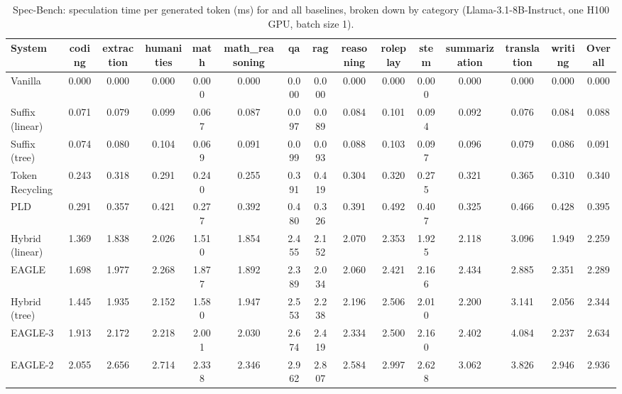 \begin{table}[htbp]
\centering
\caption{Spec-Bench: speculation time per generated token (ms) for \SuffixDecoding and all baselines, broken down by category (Llama-3.1-8B-Instruct, one H100 GPU, batch size 1).}
\label{suffixdecoding:tab:spec-spectime}
\small
\begin{adjustbox}{width=\linewidth}
\begin{tabular}{lcccccccccccccc}
\toprule
\textbf{System} & coding & extraction & humanities & math & math\_reasoning & qa & rag & reasoning & roleplay & stem & summarization & translation & writing & \textbf{Overall} \\
\midrule
Vanilla & 0.000 & 0.000 & 0.000 & 0.000 & 0.000 & 0.000 & 0.000 & 0.000 & 0.000 & 0.000 & 0.000 & 0.000 & 0.000 & 0.000 \\
Suffix (linear) & 0.071 & 0.079 & 0.099 & 0.067 & 0.087 & 0.097 & 0.089 & 0.084 & 0.101 & 0.094 & 0.092 & 0.076 & 0.084 & 0.088 \\
Suffix (tree) & 0.074 & 0.080 & 0.104 & 0.069 & 0.091 & 0.099 & 0.093 & 0.088 & 0.103 & 0.097 & 0.096 & 0.079 & 0.086 & 0.091 \\
Token Recycling & 0.243 & 0.318 & 0.291 & 0.240 & 0.255 & 0.391 & 0.419 & 0.304 & 0.320 & 0.275 & 0.321 & 0.365 & 0.310 & 0.340 \\
PLD & 0.291 & 0.357 & 0.421 & 0.277 & 0.392 & 0.480 & 0.326 & 0.391 & 0.492 & 0.407 & 0.325 & 0.466 & 0.428 & 0.395 \\
Hybrid (linear) & 1.369 & 1.838 & 2.026 & 1.510 & 1.854 & 2.455 & 2.152 & 2.070 & 2.353 & 1.925 & 2.118 & 3.096 & 1.949 & 2.259 \\
EAGLE & 1.698 & 1.977 & 2.268 & 1.877 & 1.892 & 2.389 & 2.034 & 2.060 & 2.421 & 2.166 & 2.434 & 2.885 & 2.351 & 2.289 \\
Hybrid (tree) & 1.445 & 1.935 & 2.152 & 1.580 & 1.947 & 2.553 & 2.238 & 2.196 & 2.506 & 2.010 & 2.200 & 3.141 & 2.056 & 2.344 \\
EAGLE-3 & 1.913 & 2.172 & 2.218 & 2.001 & 2.030 & 2.674 & 2.419 & 2.334 & 2.500 & 2.160 & 2.402 & 4.084 & 2.237 & 2.634 \\
EAGLE-2 & 2.055 & 2.656 & 2.714 & 2.338 & 2.346 & 2.962 & 2.807 & 2.584 & 2.997 & 2.628 & 3.062 & 3.826 & 2.946 & 2.936 \\
\bottomrule
\end{tabular}
\end{adjustbox}
\end{table}

